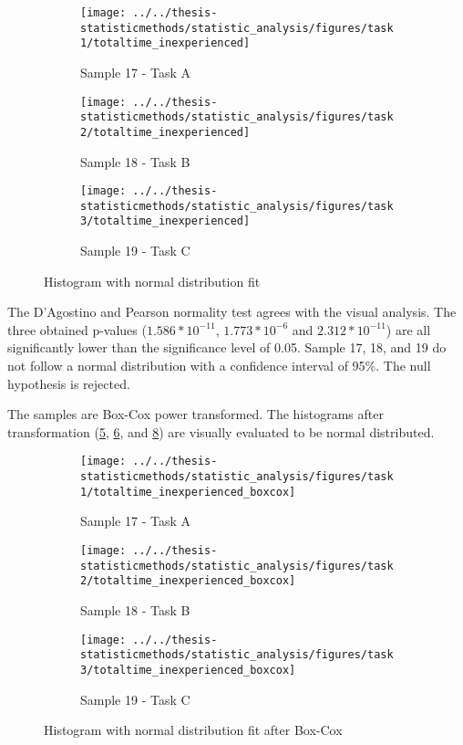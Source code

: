 \begin{figure}[H]
	\centering
	\begin{subfigure}[b]{0.32\textwidth}
		\centering
		\texttt{[image: ../../thesis-statisticmethods/statistic\_analysis/figures/task1/totaltime\_inexperienced]}
		\caption{Sample 17 - Task A}
		\label{fig:totaltimeinexperienced_task1}
	\end{subfigure}
	\begin{subfigure}[b]{0.32\textwidth}
		\centering
		\texttt{[image: ../../thesis-statisticmethods/statistic\_analysis/figures/task2/totaltime\_inexperienced]}
		\caption{Sample 18 - Task B}
		\label{fig:totaltimeinexperienced_task2}
	\end{subfigure}
	\begin{subfigure}[b]{0.32\textwidth}
		\centering
		\texttt{[image: ../../thesis-statisticmethods/statistic\_analysis/figures/task3/totaltime\_inexperienced]}
		\caption{Sample 19 - Task C}
		\label{fig:totaltimeinexperienced_task3}
	\end{subfigure}
	\caption{Histogram with normal distribution fit}
\end{figure}

The D'Agostino and Pearson normality test agrees with the visual analysis. The three obtained p-values ($1.586 * 10^{-11}$, $1.773 * 10^{-6}$ and $2.312 * 10 ^{-11}$) are all significantly lower than the significance level of 0.05. Sample 17, 18, and 19 do not follow a normal distribution with a confidence interval of 95\%. The null hypothesis is rejected. 

The samples are Box-Cox power transformed. The histograms after transformation (\ref{fig:totaltimeinexperiencedboxcox_task1}, \ref{fig:totaltimeinexperiencedboxcox_task2}, and \ref{fig:totaltimeinexperiencedboxcox_task3}) are visually evaluated to be normal distributed. 

\begin{figure}[H]
	\centering
	\begin{subfigure}[b]{0.32\textwidth}
		\centering
		\texttt{[image: ../../thesis-statisticmethods/statistic\_analysis/figures/task1/totaltime\_inexperienced\_boxcox]}
		\caption{Sample 17 - Task A}
		\label{fig:totaltimeinexperiencedboxcox_task1}
	\end{subfigure}
	\begin{subfigure}[b]{0.32\textwidth}
		\centering
		\texttt{[image: ../../thesis-statisticmethods/statistic\_analysis/figures/task2/totaltime\_inexperienced\_boxcox]}
		\caption{Sample 18 - Task B}
		\label{fig:totaltimeinexperiencedboxcox_task2}
	\end{subfigure}
	\begin{subfigure}[b]{0.32\textwidth}
		\centering
		\texttt{[image: ../../thesis-statisticmethods/statistic\_analysis/figures/task3/totaltime\_inexperienced\_boxcox]}
		\caption{Sample 19 - Task C}
		\label{fig:totaltimeinexperiencedboxcox_task3}
	\end{subfigure}
	\caption{Histogram with normal distribution fit after Box-Cox}
\end{figure}

